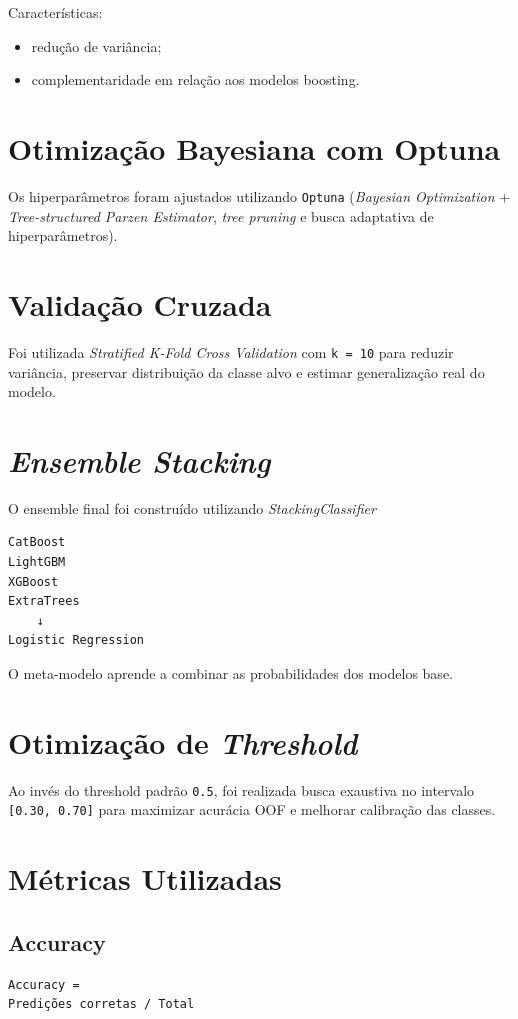 \documentclass[12pt,a4paper]{article}
\begin{document}
Características:
\begin{itemize}
\item redução de variância;
\item complementaridade em relação aos modelos boosting.
\end{itemize}
\section{Otimização Bayesiana com Optuna}
\label{sec:orgc3c63f3}
Os hiperparâmetros foram ajustados utilizando \texttt{Optuna} (\emph{Bayesian Optimization} + \emph{Tree-structured Parzen Estimator}, \emph{tree pruning} e busca adaptativa de hiperparâmetros).
\section{Validação Cruzada}
\label{sec:org069de90}

Foi utilizada \emph{Stratified K-Fold Cross Validation} com \texttt{k = 10} para reduzir variância, preservar distribuição da classe alvo e estimar generalização real do modelo.
\section{\emph{Ensemble Stacking}}
\label{sec:org2b0ef93}
O ensemble final foi construído utilizando \emph{StackingClassifier}

\begin{verbatim}
CatBoost
LightGBM
XGBoost
ExtraTrees
    ↓
Logistic Regression
\end{verbatim}

O meta-modelo aprende a combinar as probabilidades dos modelos base.
\section{Otimização de \emph{Threshold}}
\label{sec:orgbf1a893}
Ao invés do threshold padrão \texttt{0.5}, foi realizada busca exaustiva no intervalo \texttt{[0.30, 0.70]} para maximizar acurácia OOF e melhorar calibração das classes.
\section{Métricas Utilizadas}
\label{sec:org78d2562}

\subsection{Accuracy}
\label{sec:org5cd8ca2}
\begin{verbatim}
Accuracy =
Predições corretas / Total
\end{verbatim}
\end{document}
